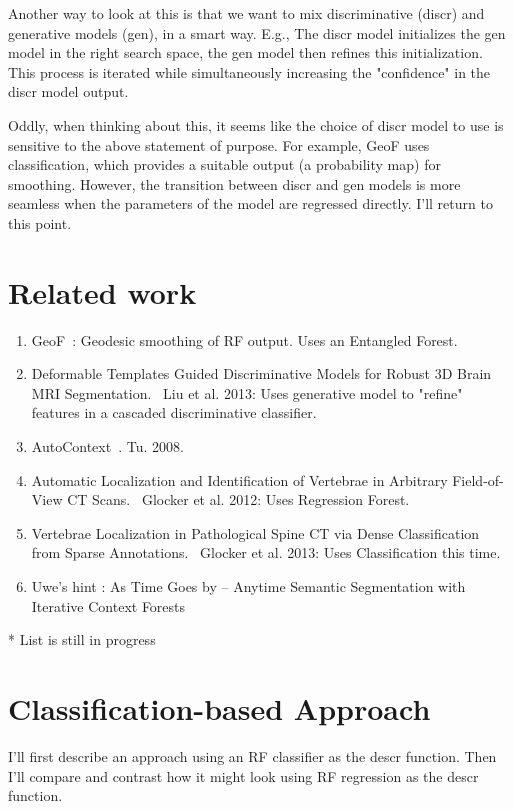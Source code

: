 \documentclass[10pt,twocolumn,letterpaper]{article}
\begin{document}
Another way to look at this is that we want to mix discriminative (discr) and generative models (gen), in a smart way.  E.g., The discr model initializes the gen model in the right search space, the gen model then refines this initialization.  This process is iterated while simultaneously increasing the "confidence" in the discr model output.

Oddly, when thinking about this, it seems like the choice of discr model to use is sensitive to the above statement of purpose.  For example, GeoF uses classification, which provides a suitable output (a probability map) for smoothing.  However, the transition between discr and gen models is more seamless when the parameters of the model are regressed directly.  I'll return to this point.

\section{Related work}

\begin{enumerate}
\item GeoF~\cite{GeoForests2013}: Geodesic smoothing of RF output.  Uses an Entangled Forest.
\item Deformable Templates Guided Discriminative Models for Robust 3D Brain MRI Segmentation.~\cite{BrainSeg2013}  Liu et al.  2013: Uses generative model to "refine" features in a cascaded discriminative classifier.
\item AutoContext~\cite{AutoContext2008}.  Tu.  2008.
\item Automatic Localization and Identification of Vertebrae in Arbitrary Field-of-View CT Scans.~\cite{Glocker2012} Glocker et al.  2012: Uses Regression Forest.
\item Vertebrae Localization in Pathological Spine CT via Dense Classification from Sparse Annotations.~\cite{Glocker2013} Glocker et al.  2013: Uses Classification this time.
\item Uwe's hint \cite{Denzler2012}: As Time Goes by -- Anytime Semantic Segmentation with Iterative Context Forests
\end{enumerate}
* List is still in progress


\section{Classification-based Approach}

I'll first describe an approach using an RF classifier as the descr function.  Then I'll compare and contrast how it might look using RF regression as the descr function.
\end{document}
